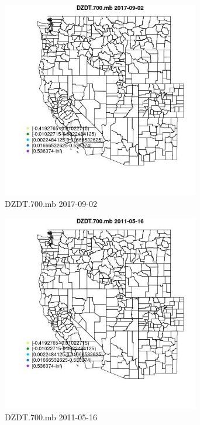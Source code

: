 \begin{figure} 
\centering  
\includegraphics[width=0.77\textwidth]{Code_Outputs/Report_ML_input_PM25_Step4_part_e_de_duplicated_aveswNAs_MapObsDZDT700mb2017-09-02.jpg} 
\caption{\label{fig:Report_ML_input_PM25_Step4_part_e_de_duplicated_aveswNAsMapObsDZDT700mb2017-09-02}DZDT.700.mb 2017-09-02} 
\end{figure} 
 

\begin{figure} 
\centering  
\includegraphics[width=0.77\textwidth]{Code_Outputs/Report_ML_input_PM25_Step4_part_e_de_duplicated_aveswNAs_MapObsDZDT700mb2011-05-16.jpg} 
\caption{\label{fig:Report_ML_input_PM25_Step4_part_e_de_duplicated_aveswNAsMapObsDZDT700mb2011-05-16}DZDT.700.mb 2011-05-16} 
\end{figure} 
 

